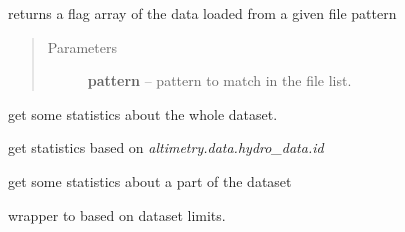 \documentclass[letterpaper,10pt,english]{sphinxmanual}
\begin{document}
\begin{fulllineitems}

\begin{fulllineitems}
\label{altimetry.data:altimetry.data.hydro_data.get_file}
returns a flag array of the data loaded from a given file pattern
\begin{quote}\begin{description}
\item[{Parameters}] \leavevmode
\textbf{pattern} -- pattern to match in the file list.

\end{description}\end{quote}

\end{fulllineitems}


\begin{fulllineitems}
\label{altimetry.data:altimetry.data.hydro_data.get_object_stats}
get some statistics about the whole dataset.

\end{fulllineitems}


\begin{fulllineitems}
\label{altimetry.data:altimetry.data.hydro_data.get_platform_stats}
get statistics based on \emph{altimetry.data.hydro\_data.id}

\end{fulllineitems}


\begin{fulllineitems}
\label{altimetry.data:altimetry.data.hydro_data.get_stats}
get some statistics about a part of the dataset

\end{fulllineitems}


\begin{fulllineitems}
\label{altimetry.data:altimetry.data.hydro_data.in_limits}
wrapper to  based on dataset limits.


\end{fulllineitems}
\end{fulllineitems}
\end{document}
